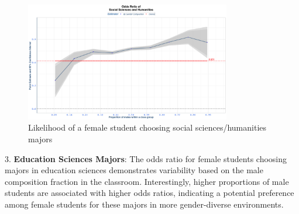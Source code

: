 \begin{figure}[H]
\centering
\includegraphics[width=0.8\textwidth]{Graph/Results/fe_panel_student_gender_composition_wome_in_SOCIAL_SCIENCES_HUMANITIES_bce.png}
\caption{Likelihood of a female student choosing social sciences/humanities majors}
\label{fig:social_sciences_humanities}
\end{figure}


3. \textbf{Education Sciences Majors}: The odds ratio for female students choosing majors in education sciences demonstrates variability based on the male composition fraction in the classroom. Interestingly, higher proportions of male students are associated with higher odds ratios, indicating a potential preference among female students for these majors in more gender-diverse environments.

